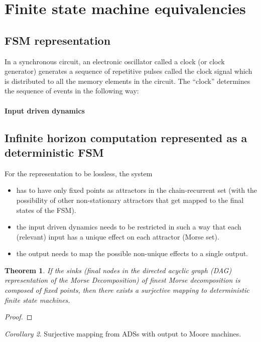 \documentclass{scrartcl}
\newtheorem{theorem}{Theorem}
\theoremstyle{definition}
\theoremstyle{remark}
\newtheorem{corollary}[theorem]{Corollary}
\begin{document}
\section{Finite state machine equivalencies}\label{sec:fsm}

\subsection{FSM representation}
In a synchronous circuit, an electronic oscillator called a clock (or clock generator) generates a sequence of repetitive pulses called the clock signal which is distributed to all the memory elements in the circuit. 
The ``clock'' determines the sequence of events in the following way:
\paragraph{Input driven dynamics}



\subsection{Infinite horizon computation represented as a deterministic FSM}
For the representation to be lossless, the system 
\begin{itemize}
\item has to have only fixed points as attractors in the chain-recurrent set (with the possibility of other non-stationary attractors that get mapped to the final states of the FSM).
\item  the input driven dynamics needs to be restricted in such a way that each (relevant) input has a unique effect on each attractor (Morse set).
\item the output needs to map the possible non-unique effects to a single output.
\end{itemize}


\begin{theorem}
If the sinks (final nodes in the directed acyclic graph (DAG) representation of the Morse Decomposition) of finest Morse decomposition is composed of fixed points, then there exists a surjective mapping to deterministic finite state machines.
\end{theorem}

\begin{proof}

\end{proof}

\begin{corollary}
Surjective mapping from ADSs with output to Moore machines.
\end{corollary}
\end{document}

